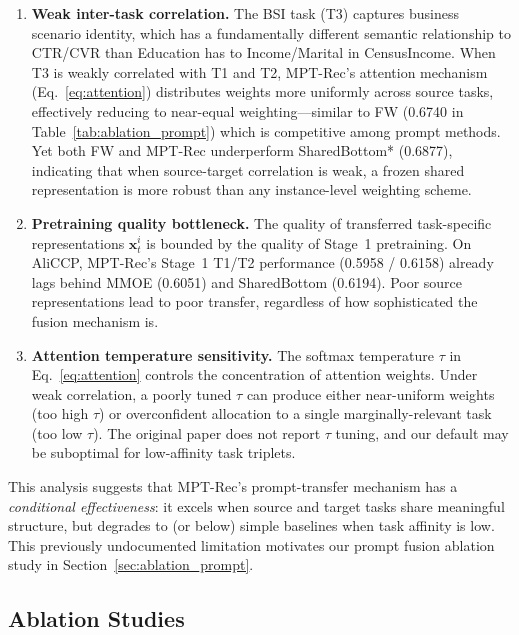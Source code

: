 \documentclass[review,anonymous]{acmart}
\begin{document}
\begin{enumerate}
  \item \textbf{Weak inter-task correlation.} The BSI task (T3) captures
    business scenario identity, which has a fundamentally different semantic
    relationship to CTR/CVR than Education has to Income/Marital in CensusIncome.
    When T3 is weakly correlated with T1 and T2, MPT-Rec's attention mechanism
    (Eq.~\ref{eq:attention}) distributes weights more uniformly across source
    tasks, effectively reducing to near-equal weighting---similar to FW (0.6740
    in Table~\ref{tab:ablation_prompt}) which is competitive among prompt methods.
    Yet both FW and MPT-Rec underperform SharedBottom* (0.6877), indicating that
    when source-target correlation is weak, a frozen shared representation is
    more robust than any instance-level weighting scheme.

  \item \textbf{Pretraining quality bottleneck.} The quality of transferred
    task-specific representations $\mathbf{x}_t^i$ is bounded by the quality of
    Stage~1 pretraining. On AliCCP, MPT-Rec's Stage~1 T1/T2 performance (0.5958
    / 0.6158) already lags behind MMOE (0.6051) and SharedBottom (0.6194). Poor
    source representations lead to poor transfer, regardless of how
    sophisticated the fusion mechanism is.

  \item \textbf{Attention temperature sensitivity.} The softmax temperature
    $\tau$ in Eq.~\ref{eq:attention} controls the concentration of attention
    weights. Under weak correlation, a poorly tuned $\tau$ can produce either
    near-uniform weights (too high $\tau$) or overconfident allocation to a
    single marginally-relevant task (too low $\tau$). The original paper does
    not report $\tau$ tuning, and our default may be suboptimal for low-affinity
    task triplets.
\end{enumerate}

This analysis suggests that MPT-Rec's prompt-transfer mechanism has a
\emph{conditional effectiveness}: it excels when source and target tasks share
meaningful structure, but degrades to (or below) simple baselines when task
affinity is low. This previously undocumented limitation motivates our prompt
fusion ablation study in Section~\ref{sec:ablation_prompt}.

\subsection{Ablation Studies}
\end{document}
